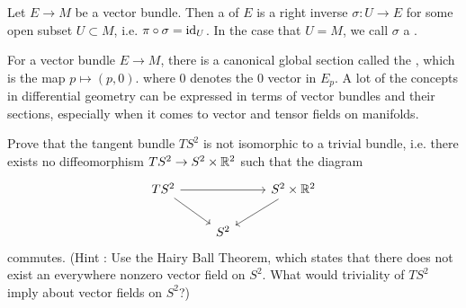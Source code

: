 %
\begin{defn}
Let $E \to M$ be a vector bundle. Then a  of $E$ is
a right inverse $\sigma:U \to E$ for some open subset $U \subset M$, i.e.
$\pi \circ \sigma = \operatorname{id}_U$. In the case that $U = M$, we call $\sigma$ a
.
\end{defn}
%
For a vector bundle $E \to M$, there is a canonical global section called
the , which is the map $p \mapsto (p, 0)$. where $0$
denotes the $0$ vector in $E_p$. A lot of the concepts in differential
geometry can be expressed in terms of vector bundles and their sections,
especially when it comes to vector and tensor fields on manifolds.
%
\begin{exer}
	Prove that the tangent bundle $TS^2$ is not isomorphic to a trivial
	bundle, i.e. there exists no diffeomorphism $TS^2 \to S^2 \times \mathbb{R}^2$
	such that the diagram
	$$\begin{tikzcd}
	TS^2 \ar[dr]\ar[rr] && S^2 \times \R^2 \ar[dl]\\
	& S^2
	\end{tikzcd}$$
	commutes. (Hint : Use the Hairy Ball Theorem, which states that
	there does not exist an everywhere nonzero vector field on $S^2$.
	What would triviality of $TS^2$ imply about vector fields on $S^2$?)
\end{exer}
%
